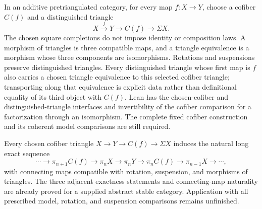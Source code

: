 \begin{definition}
  \label{def:cofiber-triangle}
  \notready
  In an additive pretriangulated category, for every map $f:X\to Y$, choose a cofiber $C(f)$ and a distinguished
  triangle
  \[
    X\xrightarrow fY\longrightarrow C(f)\longrightarrow\Sigma X.
  \]
  The chosen square completions do not impose identity or composition laws.
  A morphism of triangles is three compatible maps, and a triangle equivalence
  is a morphism whose three components are isomorphisms.  Rotations and
  suspensions preserve distinguished triangles.  Every distinguished triangle
  whose first map is $f$ also carries a chosen triangle equivalence to this
  selected cofiber triangle; transporting along that equivalence is explicit
  data rather than definitional equality of its third object with $C(f)$.
  Lean has the chosen-cofiber and distinguished-triangle interfaces and
  invertibility of the cofiber comparison for a factorization through an
  isomorphism. The
  complete fixed cofiber construction and its coherent model comparisons
  are still required.
\end{definition}

\begin{theorem}
  \label{thm:stable-homotopy-long-exact}
  \notready
  Every chosen cofiber triangle
  $X\to Y\to C(f)\to\Sigma X$ induces the natural long exact sequence
  \[
    \cdots\to\pi_{n+1}C(f)\to\pi_nX\to\pi_nY
      \to\pi_nC(f)\to\pi_{n-1}X\to\cdots,
  \]
  with connecting maps compatible with rotation, suspension, and morphisms of
  triangles.
  The three adjacent exactness statements and connecting-map naturality
  are already proved for a supplied abstract stable category. Application
  with all prescribed model, rotation, and suspension comparisons remains
  unfinished.
\end{theorem}

